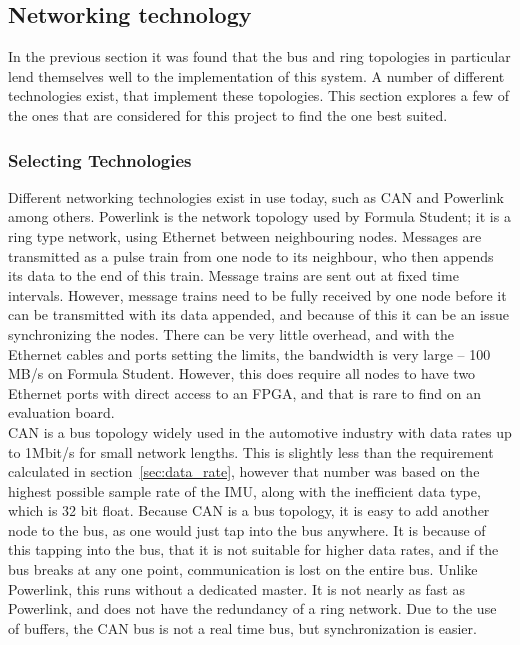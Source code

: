 \subsection{Networking technology}
In the previous section it was found that the bus and ring topologies in particular lend themselves well to the implementation of this system.
A number of different technologies exist, that implement these topologies. 
This section explores a few of the ones that are considered for this project to find the one best suited.

\subsubsection*{Selecting Technologies}
Different networking technologies exist in use today, such as CAN and Powerlink among others.
Powerlink is the network topology used by Formula Student; it is a ring type network, using Ethernet between neighbouring nodes.
Messages are transmitted as a pulse train from one node to its neighbour, who then appends its data to the end of this train. 
Message trains are sent out at fixed time intervals.
However, message trains need to be fully received by one node before it can be transmitted with its data appended, and because of this it can be an issue synchronizing the nodes.
There can be very little overhead, and with the Ethernet cables and ports setting the limits, the bandwidth is very large -- 100 MB/s on Formula Student.
However, this does require all nodes to have two Ethernet ports with direct access to an FPGA, and that is rare to find on an evaluation board.\\

CAN is a bus topology widely used in the automotive industry with data rates up to 1Mbit/s for small network lengths.
This is slightly less than the requirement calculated in section~\ref{sec:data_rate}, however that number was based on the highest possible sample rate of the IMU, along with the inefficient data type, which is 32 bit float.
Because CAN is a bus topology, it is easy to add another node to the bus, as one would just tap into the bus anywhere.
It is because of this tapping into the bus, that it is not suitable for higher data rates, and if the bus breaks at any one point, communication is lost on the entire bus.
Unlike Powerlink, this runs without a dedicated master.
It is not nearly as fast as Powerlink, and does not have the redundancy of a ring network.
Due to the use of buffers, the CAN bus is not a real time bus, but synchronization is easier.\\

